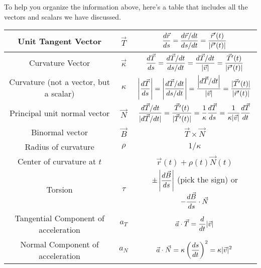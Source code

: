 To help you organize the information above, here's a table that includes all the vectors and scalars we have discussed.

\begin{center}
\begin{tabular}{|c|c|c|}
\hline
Unit Tangent Vector & $\vec T$ & $\displaystyle\frac{d\vec r}{ds} = \frac{d\vec r/dt}{ds/dt} = \frac{\vec r^\prime(t)}{|\vec r^\prime(t)|}$\\\hline
Curvature Vector & $\vec \kappa $& $\displaystyle\frac{d\vec T}{ds} =\frac{d\vec T/dt}{ds/dt} = \frac{d\vec T/dt}{|\vec v|} = \frac{\vec T^\prime(t)}{|\vec r^\prime(t)|} $\\\hline
Curvature (not a vector, but a scalar)& $ \kappa $&$\displaystyle \left|\frac{d\vec T}{ds}\right| =\left|\frac{d\vec T/dt}{ds/dt}\right| = \frac{\left|d\vec T/dt\right|}{|\vec v|}= \frac{|\vec T^\prime(t)|}{|\vec r^\prime(t)|}  $ \\\hline
Principal unit normal vector & $ \vec N$& $\displaystyle \frac{d\vec T/dt}{|d\vec T/dt|} =  \frac{\vec T^\prime(t)}{|\vec T^\prime(t)|}=\frac{1}{\kappa}\frac{d\vec T}{ds} = \frac{1}{\kappa |\vec v|}\frac{d\vec T}{dt}$\\\hline
Binormal vector & $ \vec B$& $ \vec T\times\vec N$\\\hline
Radius of curvature & $ \rho$ & $1/\kappa$\\\hline
Center of curvature at $t$&  & $\vec r(t)+\rho(t)\vec N(t)$ \\\hline
Torsion & $ \tau $ & $\displaystyle \pm\left|\frac{d\vec B}{ds}\right|$ (pick the sign) or $\displaystyle-\frac{d\vec B}{ds}\cdot \vec N $\\\hline
Tangential Component of acceleration & $ a_T$ & $\displaystyle \vec a \cdot \vec T = \frac{d}{dt}|\vec v|$\\\hline
Normal Component of acceleration & $ a_N$ & $\displaystyle \vec a \cdot \vec N = \kappa \left(\frac{ds}{dt}\right)^2 = \kappa |\vec v|^2$\\\hline
\end{tabular}
\end{center}

